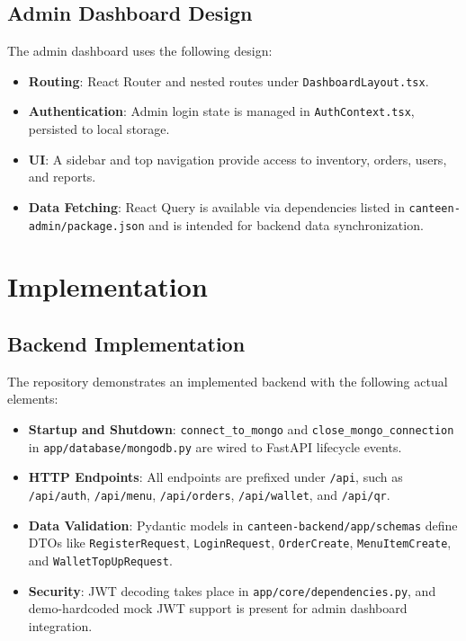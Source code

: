 \documentclass[12pt,a4paper]{report}
\begin{document}
\section{Admin Dashboard Design}
The admin dashboard uses the following design:
\begin{itemize}
  \item \textbf{Routing}: React Router and nested routes under \texttt{DashboardLayout.tsx}.
  \item \textbf{Authentication}: Admin login state is managed in \texttt{AuthContext.tsx}, persisted to local storage.
  \item \textbf{UI}: A sidebar and top navigation provide access to inventory, orders, users, and reports.
  \item \textbf{Data Fetching}: React Query is available via dependencies listed in \texttt{canteen-admin/package.json} and is intended for backend data synchronization.
\end{itemize}

\chapter{Implementation}
\section{Backend Implementation}
The repository demonstrates an implemented backend with the following actual elements:
\begin{itemize}
  \item \textbf{Startup and Shutdown}: \texttt{connect_to_mongo} and \texttt{close_mongo_connection} in \texttt{app/database/mongodb.py} are wired to FastAPI lifecycle events.
  \item \textbf{HTTP Endpoints}: All endpoints are prefixed under \texttt{/api}, such as \texttt{/api/auth}, \texttt{/api/menu}, \texttt{/api/orders}, \texttt{/api/wallet}, and \texttt{/api/qr}.
  \item \textbf{Data Validation}: Pydantic models in \texttt{canteen-backend/app/schemas} define DTOs like \texttt{RegisterRequest}, \texttt{LoginRequest}, \texttt{OrderCreate}, \texttt{MenuItemCreate}, and \texttt{WalletTopUpRequest}.
  \item \textbf{Security}: JWT decoding takes place in \texttt{app/core/dependencies.py}, and demo-hardcoded mock JWT support is present for admin dashboard integration.
\end{itemize}
\end{document}
